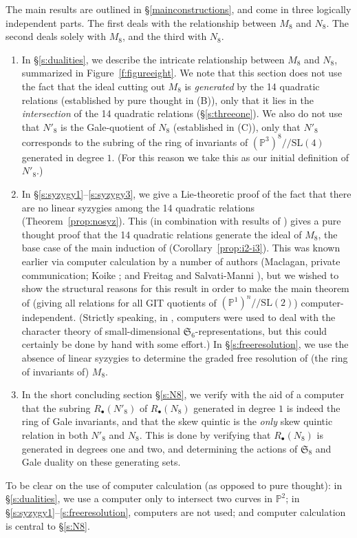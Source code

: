 \documentclass{amsart}
\theoremstyle{definition}
\theoremstyle{remark}
\def\SL{\mathrm{SL}}
\def\SS{\mathfrak{S}}
\def\proj{\mathbb{P}}
\def\cq{/\!/}
\begin{document}
The main results are outlined in \S \ref{mainconstructions}, and come in three logically independent parts.  The first
deals with the relationship between $M_8$ and $N_8$.  The second deals solely with $M_8$, and the third with $N_8$.
\begin{enumerate}
\item[(A)] In \S \ref{s:dualities}, we describe the intricate relationship between $M_8$ and $N_8$, 
summarized in Figure~\ref{f:figureeight}.  We note that this section does not use the fact that the ideal cutting
out $M_8$ is {\em generated} by the 14 quadratic relations (established by pure thought in (B)), only that it lies in the
{\em intersection} of the 14 quadratic relations (\S \ref{s:threeone}).  We also do not use that $N'_8$ is the Gale-quotient
of $N_8$ (established in (C)), only that $N'_8$ corresponds to the subring of the ring of invariants of $(\proj^3)^8
\cq \SL(4)$ generated in degree $1$.  (For this reason we take this as
our initial definition of $N'_8$.)
\item[(B)] In \S \ref{s:syzygy1}--\ref{s:syzygy3}, we give a Lie-theoretic proof of the fact
that there are no linear syzygies among the 14 quadratic relations (Theorem~\ref{prop:nosyz}).  This (in combination
with results of \cite{hmsv2}) gives a pure thought proof that the 14 quadratic relations generate the ideal of $M_8$,
the base case of the main induction of \cite{hmsv2} (Corollary~\ref{prop:i2-i3}).  This was known earlier via computer
calculation by a number of authors (Maclagan, private communication; Koike \cite{koike}; and Freitag and Salvati-Manni
\cite{fs}), but we wished to show the structural reasons for this result in order to make the main theorem of
\cite{hmsv2} (giving all relations for all GIT quotients of $(\proj^1)^n\cq \SL(2)$) computer-independent. (Strictly
speaking, in \cite{hmsv2}, computers were used to deal with the character theory of small-dimensional
$\SS_6$-representations, but this could certainly be done by hand with some effort.)  In \S \ref{s:freeresolution}, we
use the absence of linear syzygies to determine the graded free resolution of (the ring of invariants of) $M_8$.
\item[(C)] In the short concluding section \S \ref{s:N8}, we verify
  with the aid of a computer that the subring $R_{\bullet}(N'_8)$ of
  $R_{\bullet}(N_8)$ generated in degree $1$ is indeed the ring of
  Gale invariants, and that the skew quintic is the {\em only} skew quintic
  relation in both $N'_8$ and $N_8$.  This is done by verifying that
  $R_{\bullet}(N_8)$ is generated in degrees one and two, and
  determining the actions of $\SS_8$ and Gale duality on these
  generating sets.
\end{enumerate}
To be clear on the use of computer calculation (as opposed to pure thought): in \S \ref{s:dualities}, we use a computer
only to intersect two curves in $\proj^2$; in \S \ref{s:syzygy1}--\ref{s:freeresolution}, computers are not used; and
computer calculation is central to \S \ref{s:N8}.
\end{document}
